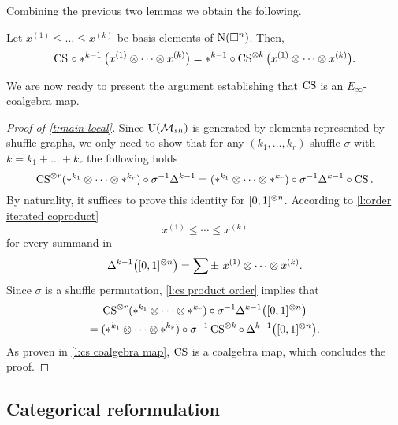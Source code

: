 Combining the previous two lemmas we obtain the following.

\begin{lemma} \label{l:cs product order}
	Let $x^{(1)} \leq \dots \leq x^{(k)}$ be basis elements of $\operatorname{N}(\square^n)$.
	Then,
	\[
	\operatorname{CS} \, \circ \ast^{k-1} \big( x^{(1)} \otimes \dotsb \otimes x^{(k)} \big)
	=
	\ast^{k-1} \circ \operatorname{CS}^{\otimes k} \big( x^{(1)} \otimes \dotsb \otimes x^{(k)} \big).
	\]
\end{lemma}

We are now ready to present the argument establishing that $\operatorname{CS}$ is an $E_\infty$-coalgebra map.

\begin{proof}[Proof of \cref{t:main local}]
	Since ${\operatorname{U}(\mathcal{M}_{sh})}$ is generated by elements represented by shuffle graphs, we only need to show that for any $(k_1,\dots,k_r)$-shuffle $\sigma$ with $k = k_1+\dots+k_r$ the following holds
	\[
	\operatorname{CS}^{\otimes r}(\ast^{k_1} \otimes \dotsb \otimes \ast^{k_r}) \circ \sigma^{-1} \Delta^{k-1} =
	(\ast^{k_1} \otimes \dotsb \otimes \ast^{k_r}) \circ \sigma^{-1} \Delta^{k-1} \circ \operatorname{CS}.
	\]
	By naturality, it suffices to prove this identity for $[0,1]^{\otimes n}$.
	According to \cref{l:order iterated coproduct}
	\[
	x^{(1)} \leq \cdots \leq x^{(k)}
	\]
	for every summand in
	\[
	\Delta^{k-1} \big([0,1]^{\otimes n}\big) =
	\sum \pm \ x^{(1)} \otimes \cdots \otimes x^{(k)}.
	\]
	Since $\sigma$ is a shuffle permutation, \cref{l:cs product order} implies that
	\begin{multline*}
		\operatorname{CS}^{\otimes r}(\ast^{k_1} \otimes \dotsb \otimes \ast^{k_r}) \circ \sigma^{-1} \Delta^{k-1} \big([0,1]^{\otimes n}\big) \\ =
		(\ast^{k_1} \otimes \dotsb \otimes \ast^{k_r}) \circ \sigma^{-1} \operatorname{CS}^{\otimes k} \circ \, \Delta^{k-1} \big([0,1]^{\otimes n}\big).
	\end{multline*}
	As proven in \cref{l:cs coalgebra map}, $\operatorname{CS}$ is a coalgebra map, which concludes the proof.
\end{proof}

\subsection{Categorical reformulation} \label{ss:e infty preservation}


